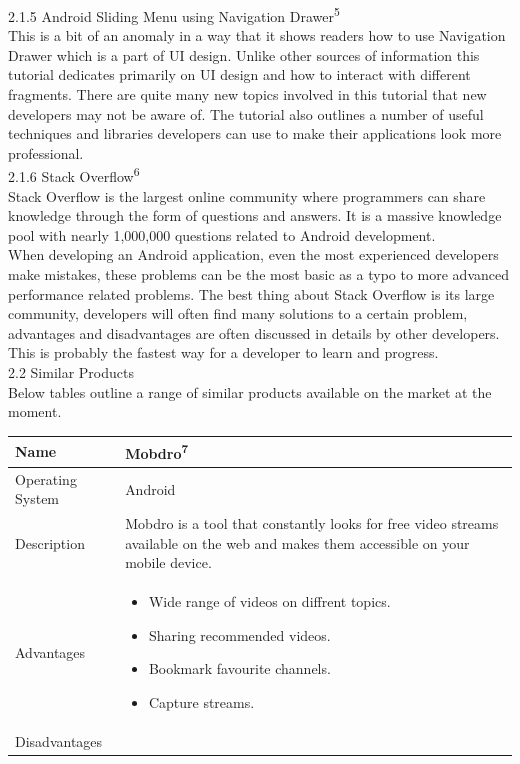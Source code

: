 \documentclass{article}
\begin{document}
\begin{flushleft}
{\large 2.1.5 Android Sliding Menu using Navigation Drawer\textsuperscript{5}}\\
This is a bit of an anomaly in a way that it shows readers how to use Navigation Drawer which is a part of UI design. Unlike other sources of information this tutorial dedicates primarily on UI design and how to interact with different fragments. There are quite many new topics involved in this tutorial that new developers may not be aware of. The tutorial also outlines a number of useful techniques and libraries developers can use to make their applications look more professional.\\
{\large 2.1.6 Stack Overflow\textsuperscript{6}}\\
Stack Overflow is the largest online community where programmers can share knowledge through the form of questions and answers. It is a massive knowledge pool with nearly 1,000,000 questions related to Android development.\\
When developing an Android application, even the most experienced developers make mistakes, these problems can be the most basic as a typo to more advanced performance related problems. The best thing about Stack Overflow is its large community, developers will often find many solutions to a certain problem, advantages and disadvantages are often discussed in details by other developers. This is probably the fastest way for a developer to learn and progress.\\
{\Large 2.2 Similar Products}\\
Below tables outline a range of similar products available on the market at the moment.
\begin{tabular}{| p{2.2cm} | p{9cm} |}
\hline
Name & Mobdro\textsuperscript{7}\\
\hline
Operating System & Android\\
\hline
Description & Mobdro is a tool that constantly looks for free video streams available on the web and makes them accessible on your mobile device.\\
\hline
Advantages & 
\begin{itemize} 
	\item Wide range of videos on diffrent topics.
	\item Sharing recommended videos.
	\item Bookmark favourite channels.
	\item Capture streams.
\end{itemize}\\
\hline
Disadvantages &

\end{tabular}
\end{flushleft}
\end{document}
